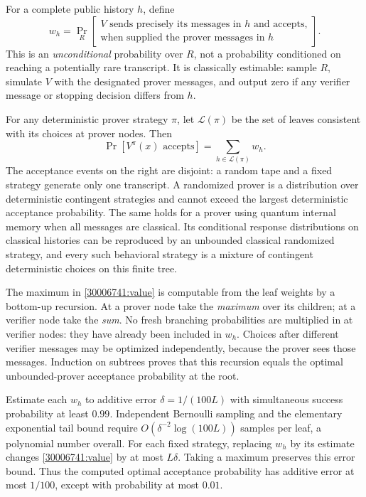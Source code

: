 \documentclass[11pt,a4paper]{article}
\numberwithin{equation}{section}
\begin{document}
For a complete public history $h$, define
\begin{equation}\label{30006741:leafweight}
 w_h=\Pr_R\left[\begin{gathered}
  V\text{ sends precisely its messages in }h\text{ and accepts,}\\
  \text{when supplied the prover messages in }h
 \end{gathered}\right].
\end{equation}
This is an \emph{unconditional} probability over $R$, not a probability
conditioned on reaching a potentially rare transcript.  It is
classically estimable: sample $R$, simulate $V$ with the designated
prover messages, and output zero if any verifier message or stopping
decision differs from $h$.

For any deterministic prover strategy $\pi$, let $\mathcal L(\pi)$ be
the set of leaves consistent with its choices at prover nodes.  Then
\begin{equation}\label{30006741:value}
 \Pr[V^\pi(x)\text{ accepts}]=\sum_{h\in\mathcal L(\pi)}w_h.
\end{equation}
The acceptance events on the right are disjoint: a random tape and a
fixed strategy generate only one transcript.  A randomized prover is
a distribution over deterministic contingent strategies and cannot
exceed the largest deterministic acceptance probability.  The same
holds for a prover using quantum internal memory when all messages
are classical.  Its conditional response distributions on classical
histories can be reproduced by an unbounded classical randomized
strategy, and every such behavioral strategy is a mixture of
contingent deterministic choices on this finite tree.

The maximum in \eqref{30006741:value} is computable from the leaf weights by
a bottom-up recursion.  At a prover node take the \emph{maximum} over
its children; at a verifier node take the \emph{sum}.  No fresh branching
probabilities are multiplied in at verifier nodes: they have already
been included in $w_h$.  Choices after different verifier messages may
be optimized independently, because the prover sees those messages.
Induction on subtrees proves that this recursion equals the optimal
unbounded-prover acceptance probability at the root.

Estimate each $w_h$ to additive error
$\delta=1/(100L)$ with simultaneous success probability at least $0.99$.
Independent Bernoulli sampling and the elementary exponential tail
bound require $O(\delta^{-2}\log(100L))$ samples per leaf, a polynomial
number overall.  For each fixed strategy, replacing $w_h$ by its estimate
changes \eqref{30006741:value} by at most $L\delta$.  Taking a maximum
preserves this error bound.  Thus the computed optimal acceptance
probability has additive error at most $1/100$, except with probability
at most $0.01$.
\end{document}
